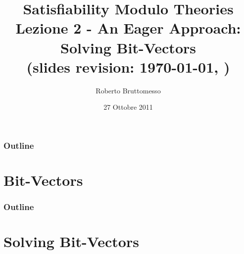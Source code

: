 \documentclass[xcolor=dvipsnames
              ]{beamer}
\title[Bit-Vectors]{Satisfiability Modulo Theories\\ Lezione 2 - An Eager Approach: Solving Bit-Vectors \\ {\tiny (slides revision: \today, \currenttime)}}
\author[R. Bruttomesso]{\large Roberto Bruttomesso}
\date{27 Ottobre 2011}
\institute[SMT]{\large Seminario di Logica Matematica \\(Corso Prof. Silvio Ghilardi)}
\begin{document}
\frame{\titlepage}



\begin{frame}
  \frametitle{Outline}
  \tableofcontents
\end{frame}

\section{Bit-Vectors}




\begin{frame}
  \frametitle{Outline}
  \tableofcontents
\end{frame}

\section{Solving Bit-Vectors}



\end{document}
